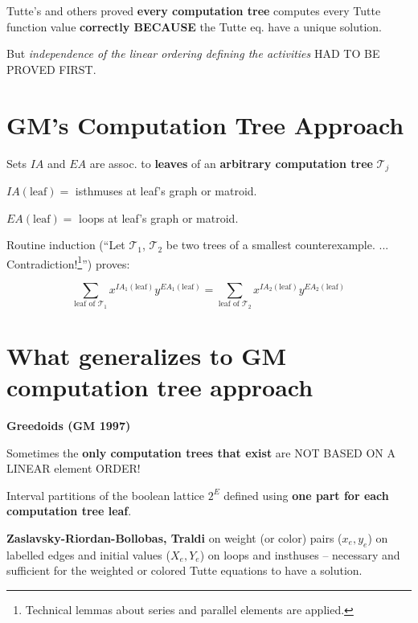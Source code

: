 \documentclass{article}
\begin{document}
Tutte's and others proved
\textbf{every computation tree} computes every Tutte function
value \textbf{correctly BECAUSE} the Tutte eq. have a unique solution.

But \textit{independence of the linear ordering defining the activities} 
HAD TO BE PROVED FIRST.

\newpage

\section{GM's Computation Tree Approach}

Sets $IA$ and $EA$ are assoc. to \textbf{leaves} of an 
\textbf{arbitrary computation tree} $\mathcal{T}_j$

\noindent
$IA(\text{leaf}) = $ isthmuses at leaf's graph or matroid.

\noindent
$EA(\text{leaf}) = $ loops at leaf's graph or matroid.

\noindent Routine induction (``Let $\mathcal{T}_1$, 
$\mathcal{T}_2$ be two trees of a smallest 
counterexample. ... Contradiction!\footnote{Technical lemmas 
about series and parallel elements are applied.}'') proves:

\[
\sum_{\text{leaf of }\mathcal{T}_1}
x^{IA_1(\text{leaf})}y^{EA_1(\text{leaf})}
=
\sum_{\text{leaf of }\mathcal{T}_2}
x^{IA_2(\text{leaf})}y^{EA_2(\text{leaf})}
\]



\newpage
\section{What generalizes to GM computation tree approach}

\noindent \textbf{Greedoids (GM 1997)}

\noindent Sometimes the \textbf{only computation trees
that exist} are NOT BASED ON A LINEAR element ORDER!

\vfill


 Interval partitions of the boolean lattice
$2^{E}$ defined using \textbf{one part for each computation tree leaf}.

\vfill


\noindent \textbf{Zaslavsky-Riordan-Bollobas, Traldi}
on weight (or color) pairs ($x_e,y_e$) on labelled edges
and initial values ($X_e,Y_e$) on loops and insthuses -- necessary and 
sufficient for the weighted or colored Tutte equations to have a 
solution.

\vfill
\end{document}
